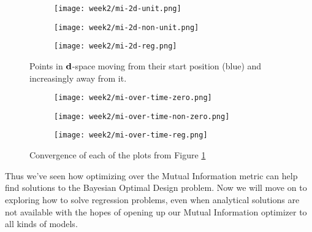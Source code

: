 \begin{figure}
  \centering
  \begin{subfigure}{.5\textwidth}
    \texttt{[image: week2/mi-2d-unit.png]}
  \end{subfigure}%
  \begin{subfigure}{.5\textwidth}
    \texttt{[image: week2/mi-2d-non-unit.png]}
  \end{subfigure}
  \begin{subfigure}{.5\textwidth}
    \texttt{[image: week2/mi-2d-reg.png]}
  \end{subfigure}
  \centering
  \caption{Points in $\mathbf{d}$-space moving from their start position (blue) and increasingly away from it.}
  \label{fig:mi-2d}
\end{figure}
\begin{figure}
  \centering
  \begin{subfigure}{.5\textwidth}
    \texttt{[image: week2/mi-over-time-zero.png]}
  \end{subfigure}%
  \begin{subfigure}{.5\textwidth}
    \texttt{[image: week2/mi-over-time-non-zero.png]}
  \end{subfigure}
  \begin{subfigure}{.5\textwidth}
    \texttt{[image: week2/mi-over-time-reg.png]}
  \end{subfigure}
  \centering
  \caption{Convergence of each of the plots from Figure \ref{fig:mi-2d}}
  \label{fig:mi-over-time}
\end{figure}
Thus we've seen how optimizing over the Mutual Information metric can help find solutions to the Bayesian Optimal Design problem.
Now we will move on to exploring how to solve regression problems, even when analytical solutions are not available with the hopes of opening up our Mutual Information optimizer to all kinds of models.
